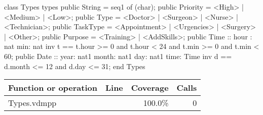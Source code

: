 \begin{vdmpp}[breaklines=true]
class Types
types
 public String = seq1 of (char);
 public Priority = <High> | <Medium> | <Low>;
 public Type = <Doctor> | <Surgeon> | <Nurse> | <Technician>;
 public TaskType = <Appointment> | <Urgencies> | <Surgery> | <Other>;
 public Purpose = <Training> | <AddSkills>;
 public Time :: hour : nat
         min: nat
 inv t == t.hour >= 0 and t.hour < 24 and t.min >= 0 and t.min < 60;
 public Date ::  year: nat1
         month: nat1
         day: nat1
         time: Time
 inv d == d.month <= 12 and d.day <= 31;
end Types
\end{vdmpp}
\bigskip
\begin{longtable}{|l|r|r|r|}
\hline
Function or operation & Line & Coverage & Calls \\
\hline
\hline
\hline
Types.vdmpp & & 100.0\% & 0 \\
\hline
\end{longtable}

